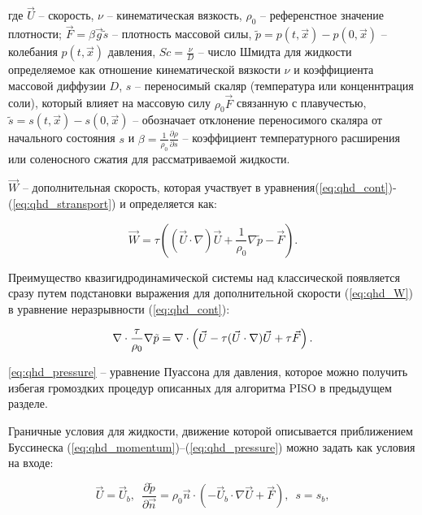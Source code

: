 \noindent где $\vec U$ -- скорость, $\nu$ -- кинематическая вязкость, $\rho_0$ -- референстное значение плотности; $\vec{F} = \beta \vec g \tilde s$ -- плотность массовой силы, $\tilde p=p(t,\vec x)-p(0,\vec x)$ -- колебания $p(t,\vec x)$ давления, $Sc=\frac{\nu}{D}$ -- число Шмидта для жидкости определяемое как отношение кинематической вязкости  $\nu$ и коэффициента массовой диффузии $D$, $s$ -- переносимый скаляр (температура или конценнтрация соли), который влияет на массовую силу $\rho_0 \vec F$ связанную с плавучестью, $\tilde s = s(t,\vec x) - s(0, \vec x)$ -- обозначает отклонение переносимого скаляра от начального состояния $s$ и $\beta=\frac{1}{\rho_0}\frac{\partial \rho }{\partial s}$ -- коэффициент температурного расширения или соленосного сжатия для рассматриваемой жидкости.

$\vec{W}$ -- дополнительная скорость, которая участвует в уравнения(\ref{eq:qhd_cont})-(\ref{eq:qhd_stransport}) и определяется как:

\begin{equation}\label{eq:qhd_W}
      \vec W = \tau \left ( (\vec U \cdot \nabla) \vec U + \frac{1}{\rho_0} \nabla \tilde p - \vec F  \right ).
\end{equation}

Преимущество квазигидродинамической системы над классической появляется сразу путем подстановки выражения для дополнительной скорости (\ref{eq:qhd_W}) в уравнение неразрывности (\ref{eq:qhd_cont}):

\begin{equation}\label{eq:qhd_pressure}
     \nabla \cdot \frac{\tau}{\rho_0}\nabla \Tilde{p} = 
     \nabla \cdot \left (\vec{U} - \tau (\vec{U} \cdot \nabla) \vec{U} +  
     \tau \vec{F} \right ).
\end{equation}

\ref{eq:qhd_pressure} -- уравнение Пуассона для давления, которое можно получить избегая громоздких процедур описанных для алгоритма PISO в предыдущем разделе. 

Граничные условия для жидкости, движение которой описывается приближением Буссинеска (\ref{eq:qhd_momentum})--(\ref{eq:qhd_pressure}) можно задать как условия на входе:

\begin{equation}\label{eq:qhd_inlet}
    \vec{U} = \vec{U}_b, \,\,\, \frac{\partial \tilde p}{ \partial \vec{n}} = \rho_0 \vec n \cdot \left ( -\vec U_b \cdot \nabla \vec U + \vec F \right), \,\,\, s = s_b,
\end{equation}  

